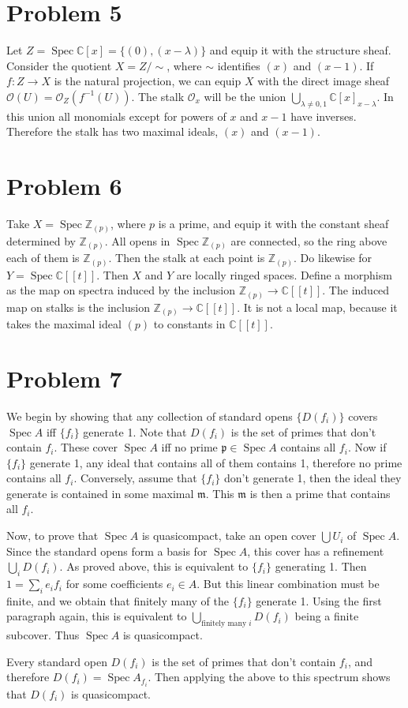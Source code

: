 \documentclass[12 pt]{article}
\newcommand{\Z}{\mathbb{Z}}
\newcommand{\C}{\mathbb{C}}
\newcommand{\fr}{\mathfrak}
\DeclareMathOperator{\Spec}{Spec}
\begin{document}
\section*{Problem 5}
Let $Z = \Spec \C[x] = \{ (0), (x-\lambda)\}$ and equip it with the structure sheaf. Consider the quotient $X = Z/ \sim$, where $\sim$ identifies $(x)$ and $(x-1)$. If $f: Z \to X$ is the natural projection, we can equip $X$ with the direct image sheaf $\mathcal{O}(U) = \mathcal{O}_Z (f^{-1}(U))$. The stalk $\mathcal{O}_x$ will be the union $\bigcup_{\lambda \neq 0,1} \C[x]_{x-\lambda}$. In this union all monomials except for powers of $x$ and $x-1$ have inverses. Therefore the stalk has two maximal ideals, $(x)$ and $(x-1)$.

\section*{Problem 6}
Take $X = \Spec \Z_{(p)}$, where $p$ is a prime, and equip it with the constant sheaf determined by $\Z_{(p)}$. All opens in $\Spec \Z_{(p)}$ are connected, so the ring above each of them is $\Z_{(p)}$. Then the stalk at each point is $\Z_{(p)}$. Do likewise for $Y = \Spec \C[[t]]$. Then $X$ and $Y$ are locally ringed spaces. Define a morphism as the map on spectra induced by the inclusion $\Z_{(p)} \to \C[[t]]$. The induced map on stalks is the inclusion $\Z_{(p)} \to \C[[t]]$. It is not a local map, because it takes the maximal ideal $(p)$ to constants in $\C[[t]]$. 


\section*{Problem 7}
We begin by showing that any collection of standard opens $\{D(f_i)\}$ covers $\Spec A$ iff $\{f_i\}$ generate 1. Note that $D(f_i)$ is the set of primes that don't contain $f_i$. These cover $\Spec A$ iff no prime $\fr p \in \Spec A$ contains all $f_i$. Now if $\{f_i\}$ generate 1, any ideal that contains all of them contains 1, therefore no prime contains all $f_i$. Conversely, assume that $\{f_i\}$ don't generate 1, then the ideal they generate is contained in some maximal $\fr m$. This $\fr m$ is then a prime that contains all $f_i$.

Now, to prove that $\Spec A$ is quasicompact, take an open cover $\bigcup U_i$ of $\Spec A$. Since the standard opens form a basis for $\Spec A$, this cover has a refinement $\bigcup_i D(f_i)$. As proved above, this is equivalent to $\{f_i\}$ generating 1. Then $1 = \sum_i e_i f_i$ for some coefficients $e_i \in A$. But this linear combination must be finite, and we obtain that finitely many of the $\{f_i\}$ generate 1. Using the first paragraph again, this is equivalent to $\bigcup_{\text{finitely many }i} D(f_i)$ being a finite subcover. Thus $\Spec A$ is quasicompact.

Every standard open $D(f_i)$ is the set of primes that don't contain $f_i$, and therefore $D(f_i) = \Spec A_{f_i}$. Then applying the above to this spectrum shows that $D(f_i)$ is quasicompact.
\end{document}
